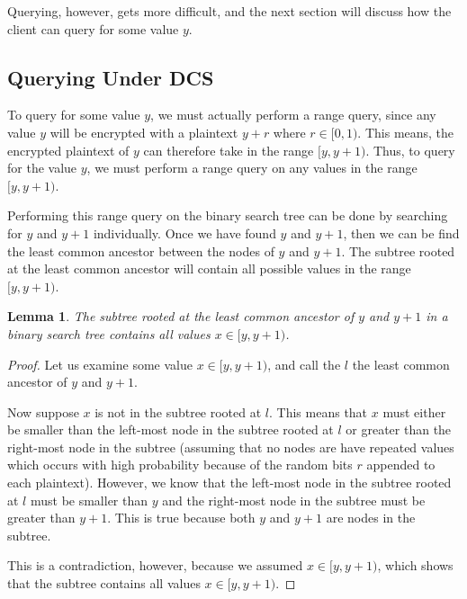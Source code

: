 \documentclass[12pt]{article}
\newtheorem{lemma}[theorem]{Lemma}
\begin{document}
\begin{figure}
\end{figure}

Querying, however, gets more difficult, and the next section will discuss how the client can query for some value $y$.

\subsection{Querying Under DCS}

  To query for some value $y$, we must actually perform a range query, since any value $y$ will be encrypted with a plaintext $y + r$ where $r \in [0,1)$. This means, the encrypted plaintext of $y$ can therefore take in the range $[y, y + 1)$. Thus, to query for the value $y$, we must perform a range query on any values in the range $[y, y+1)$.

  Performing this range query on the binary search tree can be done by searching for $y$ and $y+1$ individually. Once we have found $y$ and $y+1$, then we can be find the least common ancestor between the nodes of $y$ and $y+1$. The subtree rooted at the least common ancestor will contain all possible values in the range $[y, y+1)$. 

  \begin{lemma}
    The subtree rooted at the least common ancestor of $y$ and $y+1$ in a binary search tree contains all values $x \in [y, y+1)$.
  \end{lemma}
  \begin{proof}
    Let us examine some value $x \in [y, y+1)$, and call the $l$ the least common ancestor of $y$ and $y+1$.

    Now suppose $x$ is not in the subtree rooted at $l$. This means that $x$ must either be smaller than the left-most node in the subtree rooted at $l$ or greater than the right-most node in the subtree (assuming that no nodes are have repeated values which occurs with high probability because of the random bits $r$ appended to each plaintext). However, we know that the left-most node in the subtree rooted at $l$ must be smaller than $y$ and the right-most node in the subtree must be greater than $y+1$. This is true because both $y$ and $y+1$ are nodes in the subtree.

    This is a contradiction, however, because we assumed $x \in [y, y+1)$, which shows that the subtree contains all values $x \in [y, y+1)$.
  \end{proof}
  
\end{document}
